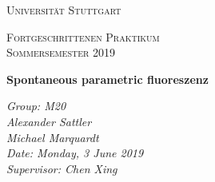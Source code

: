 \documentclass[aps,amsmath,amssymb,amsfont]{scrartcl}
\numberwithin{equation}{section}
\begin{document}
	\begin{titlepage}
	\centering
	\par\vspace{1cm}
	{\scshape\LARGE Universität Stuttgart \par}
	\vspace{1cm}
	{\scshape\Large  Fortgeschrittenen Praktikum \\ Sommersemester 2019\par}
	\vspace{1.5cm}
	{\huge\bfseries Spontaneous parametric fluoreszenz\par}
	\vspace{2cm}
	{\Large\itshape Group: M20\\ Alexander Sattler  \\  Michael Marquardt    \\ Date: Monday, 3 June 2019\\ Supervisor: Chen Xing\\ \par}
	\end{titlepage}


\tableofcontents
\newpage





\printbibliography
\end{document}
